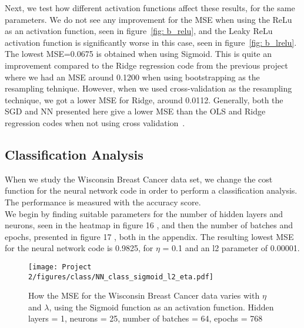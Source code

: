 \documentclass[english,notitlepage,reprint,nofootinbib]{revtex4-2}  %
\begin{document}
Next, we test how different activation functions affect these results, for the same parameters. 
We do not see any improvement for the MSE when using the ReLu as an activation function, seen in figure~\ref{fig: b_relu}, and the Leaky ReLu activation function is significantly worse in this case, seen in figure~\ref{fig: b_lrelu}. 
The lowest MSE=0.0675 is obtained when using Sigmoid. This is quite an improvement compared to the Ridge regression code from the previous project where we had an MSE around 0.1200 when using bootstrapping as the resampling tehnique. However, when we used cross-validation as the resampling technique, we got a lower MSE for Ridge, around 0.0112. 
Generally, both the SGD and NN presented here give a lower MSE than the OLS and Ridge regression codes when not using cross validation~\cite{proj1}. 





\subsection*{Classification Analysis}%
When we study the Wisconsin Breast Cancer data set, we change the cost function for the neural network code in order to perform a classification analysis. The performance is measured with the accuracy score. 
\vspace{3mm}
\\ 
We begin by finding suitable parameters for the number of hidden layers and neurons, seen in the heatmap in figure 16
, and then the number of batches and epochs, presented in figure 17
, both in the appendix. 
The resulting lowest MSE for the neural network code is 0.9825, for $\eta$ = 0.1 and an l2 parameter of 0.00001. 

\begin{figure}[h!]
    \centering %
    \texttt{[image: Project 2/figures/class/NN\_class\_sigmoid\_l2\_eta.pdf]} 
    \caption{How the MSE for the Wisconsin Breast Cancer data varies with $\eta$ and $\lambda$, using the Sigmoid function as an activation function. Hidden layers = 1, neurons = 25, number of batches = 64, epochs = 768
    }
    \label{fig: nn_l2_eta}
\end{figure}
\end{document}
